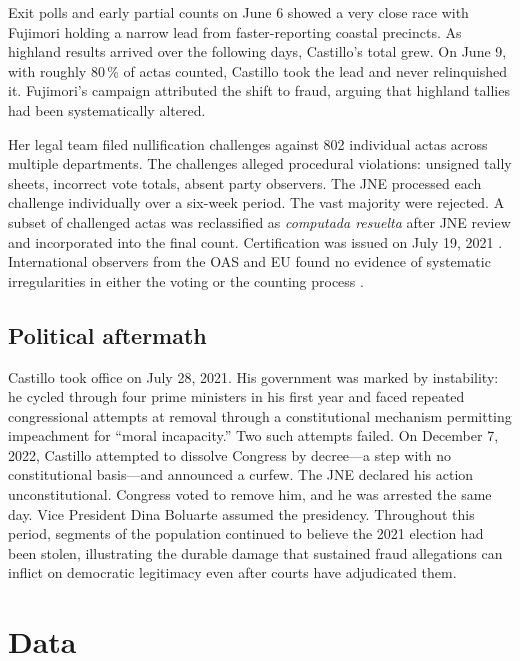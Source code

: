 \documentclass[12pt]{article}
\begin{document}
Exit polls and early partial counts on June 6 showed a very close race with
Fujimori holding a narrow lead from faster-reporting coastal precincts. As
highland results arrived over the following days, Castillo's total grew. On
June 9, with roughly 80\,\% of actas counted, Castillo took the lead and never
relinquished it. Fujimori's campaign attributed the shift to fraud, arguing
that highland tallies had been systematically altered.

Her legal team filed nullification challenges against 802 individual actas
across multiple departments. The challenges alleged procedural violations:
unsigned tally sheets, incorrect vote totals, absent party observers. The JNE
processed each challenge individually over a six-week period. The vast majority
were rejected. A subset of challenged actas was reclassified as
\emph{computada resuelta} after JNE review and incorporated into the final
count. Certification was issued on July 19, 2021 \citep{jne2021}.
International observers from the OAS and EU found no evidence of systematic
irregularities in either the voting or the counting process \citep{oas2021,
eu2021}.

\subsection{Political aftermath}

Castillo took office on July 28, 2021. His government was marked by
instability: he cycled through four prime ministers in his first year and faced
repeated congressional attempts at removal through a constitutional mechanism
permitting impeachment for ``moral incapacity.'' Two such attempts failed. On
December 7, 2022, Castillo attempted to dissolve Congress by decree---a step
with no constitutional basis---and announced a curfew. The JNE declared his
action unconstitutional. Congress voted to remove him, and he was arrested the
same day. Vice President Dina Boluarte assumed the presidency. Throughout this
period, segments of the population continued to believe the 2021 election had
been stolen, illustrating the durable damage that sustained fraud allegations
can inflict on democratic legitimacy even after courts have adjudicated them.

\section{Data}
\label{sec:data}
\end{document}
